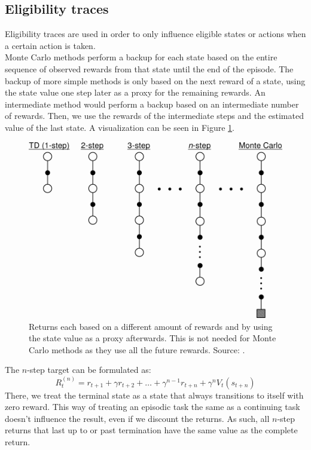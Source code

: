 \documentclass[a4paper, 11pt]{article}
\begin{document}
\subsection{Eligibility traces}
\label{sub:rl_et}
Eligibility traces are used in order to only influence eligible states or actions when a certain action is taken.\\
Monte Carlo methods perform a backup for each state based on the entire sequence of observed rewards from that state until the end of the episode. The backup of more simple methods is only based on the next reward of a state, using the state value one step later as a proxy for the remaining rewards. An intermediate method would perform a backup based on an intermediate number of rewards. Then, we use the rewards of the intermediate steps and the estimated value of the last state. A visualization can be seen in Figure \ref{fig:nStepTD}.
\begin{figure}[htb]
\includegraphics[width=\linewidth]{images/nStepTD.png}
\caption[$n$-step returns]{Returns each based on a different amount of rewards and by using the state value as a proxy afterwards. This is not needed for Monte Carlo methods as they use all the future rewards. Source: \cite{Sutton1998ReinforcementIntroduction}.}
\label{fig:nStepTD}
\end{figure}
The $n$-step target can be formulated as:
\begin{equation}
R_t^{(n)} = r_{t+1} + \gamma r_{t+2} + \dots + \gamma^{n-1}r_{t+n} + \gamma^n V_t(s_{t+n})
\end{equation}
There, we treat the terminal state as a state that always transitions to itself with zero reward. This way of treating an episodic task the same as a continuing task doesn't influence the result, even if we discount the returns. As such, all $n$-step returns that last up to or past termination have the same value as the complete return.\\
\end{document}
